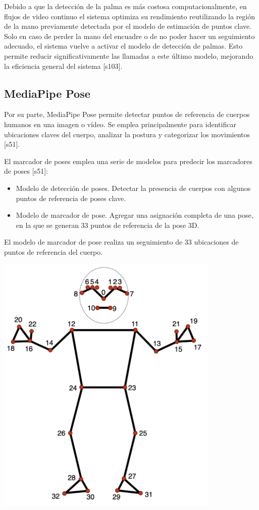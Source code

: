 Debido a que la detección de la palma es más costosa computacionalmente, en flujos de video continuo el sistema optimiza su rendimiento reutilizando la región de la mano previamente detectada por el modelo de estimación de puntos clave. Solo en caso de perder la mano del encuadre o de no poder hacer un seguimiento adecuado, el sistema vuelve a activar el modelo de detección de palmas. Esto permite reducir significativamente las llamadas a este último modelo, mejorando la eficiencia general del sistema [s103].\\

\subsection{MediaPipe Pose}
Por su parte, MediaPipe Pose permite detectar puntos de referencia de cuerpos humanos en una imagen o vídeo. Se emplea principalmente para identificar ubicaciones claves del cuerpo, analizar la postura y categorizar los movimientos [s51].

El marcador de poses emplea una serie de modelos para predecir los marcadores de poses [s51]:
\begin{itemize}

    \item Modelo de detección de poses. Detectar la presencia de cuerpos con algunos puntos de referencia de poses clave.
    \item Modelo de marcador de pose. Agregar una asignación completa de una pose, en la que se generan 33 puntos de referencia de la pose 3D.

\end{itemize}
El modelo de marcador de pose realiza un seguimiento de 33 ubicaciones de puntos de referencia del cuerpo.
\begin{center}
    \includegraphics[width=0.8\textwidth]{Images/Cap 2/MediaPipe_Pose.png}
\end{center}


